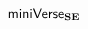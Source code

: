 \section{\texorpdfstring{$\mathsf{miniVerse}_\textbf{SE}$}{miniVerseSE}}\label{sec:tsms-minimal-formalism}\label{sec:miniVerseU}
\vspace{-3px}
